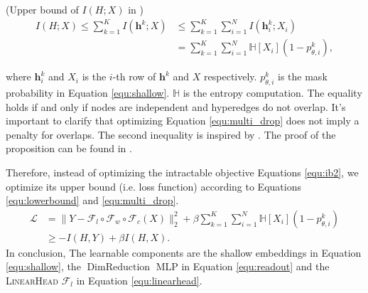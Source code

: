 \begin{proposition}
    (Upper bound of $I(H;X)$ in \multiheadname{})
\begin{equation}
\label{equ:multi_drop}
    \begin{aligned}
        I(H; X) 
        \leq \sum_{k=1}^K
        I(\boldsymbol{h}^k; X)
        &\leq \sum_{k=1}^K \sum_{i=1}^N
        I(\boldsymbol{h}^k_i; X_i)\\
        &= \sum_{k=1}^K\sum_{i=1}^N \mathbb{H}[X_i] (1 - p^k_{\theta, i}),
    \end{aligned}
\end{equation}
\end{proposition}

where $\boldsymbol{h}^k_i$ and $X_i$  is the $i$-th row of $\boldsymbol{h}^k$ and $X$ respectively.  $p^k_{\theta,i}$ is the mask probability in Equation \ref{equ:shallow}. $\mathbb{H}$ is the entropy computation. The equality holds if and only if nodes are independent and hyperedges do not overlap. It's important to clarify that optimizing Equation \ref{equ:multi_drop} does not imply a penalty for overlaps. The second inequality is inspired by \cite{kim2021drop}. The proof of the proposition can be found in \citet{qiu2023learning}.


Therefore, instead of optimizing the intractable objective Equations \ref{equ:ib2}, we optimize its upper bound (i.e. loss function) according to Equations \ref{equ:lowerbound} and \ref{equ:multi_drop}.
\begin{equation}
\begin{aligned}
    \mathcal{L} &= \| Y - \mathcal{F}_l \circ \mathcal{F}_w \circ \mathcal{F}_c (X) \|_2^2 + \beta \sum_{k=1}^K\sum_{i=1}^N \mathbb{H}[X_i] (1 - p^k_{\theta,i}) \\&\geq - I(H, Y) + \beta I(H, X).
\end{aligned}
\end{equation}
In conclusion, The learnable components are the shallow embeddings in Equation \ref{equ:shallow}, the $\operatorname{DimReduction}$ MLP in Equation \ref{equ:readout} and the \textsc{LinearHead} $\mathcal{F}_l$ in Equation \ref{equ:linearhead}.
